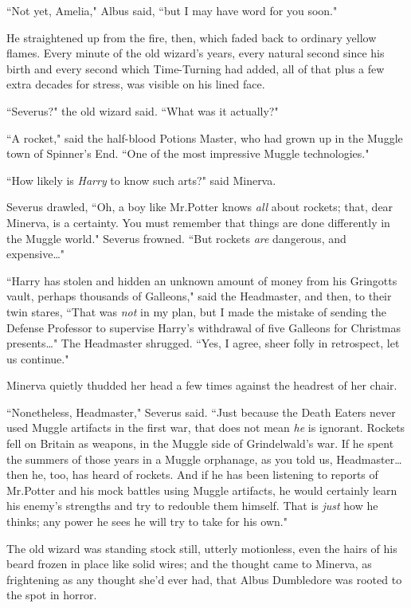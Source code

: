 ``Not yet, Amelia," Albus said, ``but I may have word for you soon."

He straightened up from the fire, then, which faded back to ordinary yellow flames. Every minute of the old wizard's years, every natural second since his birth and every second which Time-Turning had added, all of that plus a few extra decades for stress, was visible on his lined face.

``Severus?" the old wizard said. ``What was it actually?"

``A rocket," said the half-blood Potions Master, who had grown up in the Muggle town of Spinner's End. ``One of the most impressive Muggle technologies."

``How likely is \emph{Harry} to know such arts?" said Minerva.

Severus drawled, ``Oh, a boy like Mr.\?Potter knows \emph{all} about rockets; that, dear Minerva, is a certainty. You must remember that things are done differently in the Muggle world." Severus frowned. ``But rockets \emph{are} dangerous, and expensive{\ldots}"

``Harry has stolen and hidden an unknown amount of money from his Gringotts vault, perhaps thousands of Galleons," said the Headmaster, and then, to their twin stares, ``That was \emph{not} in my plan, but I made the mistake of sending the Defense Professor to supervise Harry's withdrawal of five Galleons for Christmas presents{\ldots}" The Headmaster shrugged. ``Yes, I agree, sheer folly in retrospect, let us continue."

Minerva quietly thudded her head a few times against the headrest of her chair.

``Nonetheless, Headmaster," Severus said. ``Just because the Death Eaters never used Muggle artifacts in the first war, that does not mean \emph{he} is ignorant. Rockets fell on Britain as weapons, in the Muggle side of Grindelwald's war. If he spent the summers of those years in a Muggle orphanage, as you told us, Headmaster{\ldots} then he, too, has heard of rockets. And if he has been listening to reports of Mr.\?Potter and his mock battles using Muggle artifacts, he would certainly learn his enemy's strengths and try to redouble them himself. That is \emph{just} how he thinks; any power he sees he will try to take for his own."

The old wizard was standing stock still, utterly motionless, even the hairs of his beard frozen in place like solid wires; and the thought came to Minerva, as frightening as any thought she'd ever had, that Albus Dumbledore was rooted to the spot in horror.


